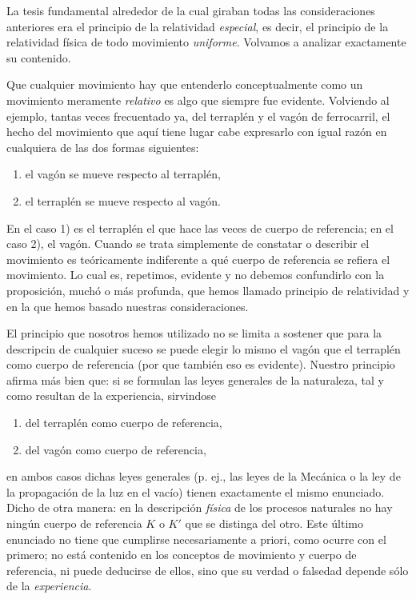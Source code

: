 \documentclass[spanish]{book}
\begin{document}
La tesis fundamental alrededor de la cual giraban todas las consideraciones anteriores
era el principio de la relatividad \textit{especial}, es decir, el principio de la relatividad física de
todo movimiento \textit{uniforme}. Volvamos a analizar exactamente su contenido.

Que cualquier movimiento hay que entenderlo conceptualmente como un
movimiento meramente \textit{relativo} es algo que siempre fue evidente. Volviendo al ejemplo, 
tantas veces frecuentado ya, del terraplén y el vagón de ferrocarril, el hecho del
movimiento que aquí tiene lugar cabe expresarlo con igual razón en cualquiera de las
dos formas siguientes:
\begin{enumerate}
\item el vagón se mueve respecto al terraplén,
\item el terraplén se mueve respecto al vagón.
\end{enumerate}
En el caso 1) es el terraplén el que hace las veces de cuerpo de referencia; en el caso
2), el vagón. Cuando se trata simplemente de constatar o describir el movimiento es
teóricamente indiferente a qué cuerpo de referencia se refiera el movimiento. Lo cual
es, repetimos, evidente y no debemos confundirlo con la proposición, muchó o más
profunda, que hemos llamado principio de relatividad y en la que hemos basado
nuestras consideraciones.

El principio que nosotros hemos utilizado no se limita a sostener que para la
descripcin de cualquier suceso se puede elegir lo mismo el vagón que el terraplén
como cuerpo de referencia (por que también eso es evidente). Nuestro principio
afirma más bien que: si se formulan las leyes generales de la naturaleza, tal y como
resultan de la experiencia, sirvindose
\begin{enumerate}
\item del terraplén como cuerpo de referencia, 
\item del vagón como cuerpo de referencia,
\end{enumerate}
\noindent en ambos casos dichas leyes generales (p. ej., las leyes de la Mecánica o la ley de la
propagación de la luz en el vacío) tienen exactamente el mismo enunciado. Dicho de
otra manera: en la descripción \textit{física} de los procesos naturales no hay ningún cuerpo
de referencia $K$ o $K'$ que se distinga del otro. Este último enunciado no tiene que
cumplirse necesariamente a priori, como ocurre con el primero; no está contenido en
los conceptos de movimiento y cuerpo de referencia, ni puede deducirse de ellos,
sino que su verdad o falsedad depende sólo de la \textit{experiencia}.
\end{document}
